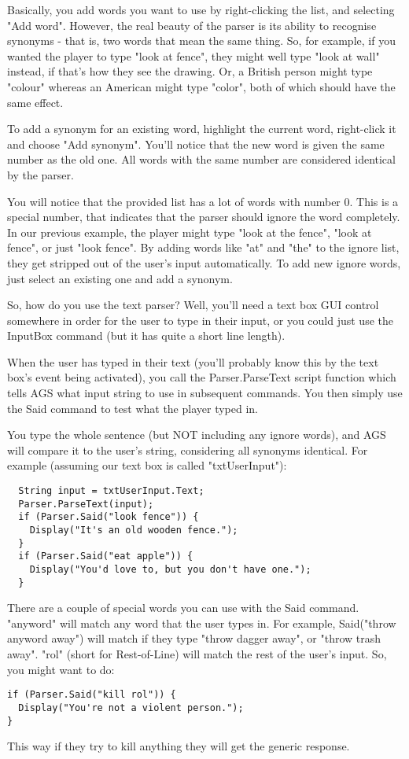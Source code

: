 Basically, you add words you want to use by right-clicking the list, and
selecting "Add word".
However, the real beauty of the parser is its ability to recognise synonyms -
that is, two words that mean the same thing. So, for example, if you wanted
the player to type "look at fence", they might well type "look at wall"
instead, if that's how they see the drawing. Or, a British person might type
"colour" whereas an American might type "color", both of which should have
the same effect.

To add a synonym for an existing word, highlight the current word, right-click it
and choose "Add synonym". You'll notice that the new word is given the same
number as the old one. All words with the same number are considered identical
by the parser.

You will notice that the provided list has a lot of words with number 0. This
is a special number, that indicates that the parser should ignore the word
completely. In our previous example, the player might type "look at the fence",
"look at fence", or just "look fence". By adding words like "at" and "the" to
the ignore list, they get stripped out of the user's input automatically. To
add new ignore words, just select an existing one and add a synonym.

So, how do you use the text parser? Well, you'll need a text box GUI control
somewhere in order for the user to type in their input, or you could just
use the InputBox command (but it has quite a short line length).

When the user has typed in their text (you'll probably know this by the text
box's event being activated), you call the  Parser.ParseText  script
function which tells AGS what input string to use in subsequent commands.
You then simply use the Said command to test what the player typed in.

You type the whole sentence (but NOT including any ignore words), and AGS will
compare it to the user's string, considering all synonyms identical.
For example (assuming our text box is called "txtUserInput"):
\begin{verbatim}
  String input = txtUserInput.Text;
  Parser.ParseText(input);
  if (Parser.Said("look fence")) {
    Display("It's an old wooden fence.");
  }
  if (Parser.Said("eat apple")) {
    Display("You'd love to, but you don't have one.");
  }
\end{verbatim}
There are a couple of special words you can use with the Said command.
"anyword" will match any word that the user types in. For example,
Said("throw anyword away")  will match if they type "throw dagger away",
or "throw trash away".
"rol" (short for Rest-of-Line) will match the rest of the user's input. So,
you might want to do:
\begin{verbatim}
if (Parser.Said("kill rol")) {
  Display("You're not a violent person.");
}
\end{verbatim}
This way if they try to kill anything they will get the generic response.

